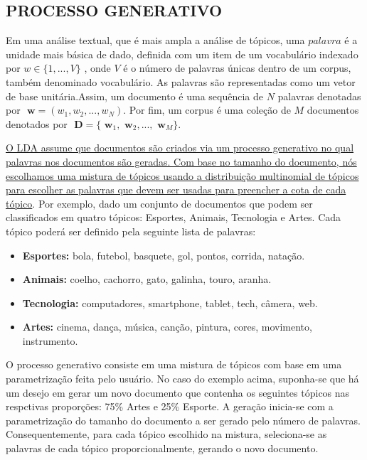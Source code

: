 \documentclass[12pt,a4paper]{article}
\begin{document}
  
  
  \subsection{PROCESSO GENERATIVO}
  
  Em uma análise textual, que é mais ampla a análise de  tópicos, uma $palavra$ é a unidade mais básica de dado, definida com um item de um vocabulário indexado por \(w \in \{1,. . . , V\}\)  , onde $V$ é o número de palavras únicas dentro de um corpus, também denominado vocabulário. As palavras são representadas como um vetor de base unitária.Assim, um documento é uma sequência de $N$ palavras denotadas por \(\textbf{ w} = (w_1, w_2,. . . ,  w_N)\). Por fim, um corpus é uma coleção de $M$ documentos denotados por \(\textbf{ D} = \{\textbf{ w}_1, \textbf{ w}_2, . . ., \textbf{ w}_M\}\).
  
  \underline{O LDA assume que documentos são criados via um processo generativo no qual palavras nos documentos são geradas. Com base no tamanho do documento,
   nós escolhamos uma mistura de tópicos usando a distribuição multinomial de tópicos para escolher as palavras que devem ser usadas para preencher a cota de cada tópico}. Por exemplo, dado um conjunto de documentos que podem ser classificados em quatro tópicos: Esportes, Animais, Tecnologia e Artes. Cada tópico poderá ser definido pela seguinte lista de palavras:
  
  \begin{itemize}
    \item \textbf{ Esportes:} bola, futebol, basquete, gol, pontos, corrida, natação.
    \item \textbf{ Animais:} coelho, cachorro, gato, galinha, touro, aranha.
    \item \textbf{ Tecnologia:} computadores, smartphone, tablet, tech, câmera, web.
    \item \textbf{ Artes:} cinema, dança, música, canção, pintura, cores, movimento, instrumento.
  \end{itemize}
  
  O processo generativo consiste em uma mistura de tópicos com base em uma parametrização feita pelo usuário. No caso do exemplo acima, suponha-se que há um desejo em gerar um novo documento que contenha os seguintes tópicos nas respctivas proporções: 75\% Artes e 25\% Esporte. A geração inicia-se com a parametrização do tamanho do documento a ser gerado pelo número de palavras. Consequentemente, para cada tópico escolhido na mistura, seleciona-se as palavras de cada tópico proporcionalmente, gerando o novo documento.
  
\end{document}
